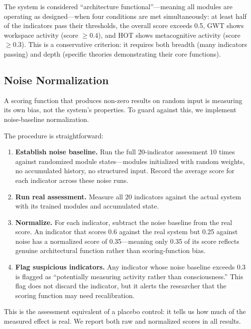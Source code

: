The system is considered ``architecture functional''---meaning all modules are operating as designed---when four conditions are met simultaneously: at least half of the indicators pass their thresholds, the overall score exceeds 0.5, GWT shows workspace activity (score $\geq 0.4$), and HOT shows metacognitive activity (score $\geq 0.3$). This is a conservative criterion: it requires both breadth (many indicators passing) and depth (specific theories demonstrating their core functions).

\subsection{Noise Normalization}

A scoring function that produces non-zero results on random input is measuring its own bias, not the system's properties. To guard against this, we implement noise-baseline normalization.

The procedure is straightforward:

\begin{enumerate}
    \item \textbf{Establish noise baseline.} Run the full 20-indicator assessment 10 times against randomized module states---modules initialized with random weights, no accumulated history, no structured input. Record the average score for each indicator across these noise runs.

    \item \textbf{Run real assessment.} Measure all 20 indicators against the actual system with its trained modules and accumulated state.

    \item \textbf{Normalize.} For each indicator, subtract the noise baseline from the real score. An indicator that scores 0.6 against the real system but 0.25 against noise has a normalized score of 0.35---meaning only 0.35 of its score reflects genuine architectural function rather than scoring-function bias.

    \item \textbf{Flag suspicious indicators.} Any indicator whose noise baseline exceeds 0.3 is flagged as ``potentially measuring activity rather than consciousness.'' This flag does not discard the indicator, but it alerts the researcher that the scoring function may need recalibration.
\end{enumerate}

This is the assessment equivalent of a placebo control: it tells us how much of the measured effect is real. We report both raw and normalized scores in all results.

